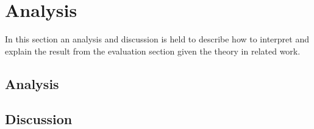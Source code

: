 \section{Analysis}
In this section an analysis and discussion is held to describe how to interpret and explain the result from the evaluation section given the theory in related work.

\subsection{Analysis} %

\subsection{Discussion} %